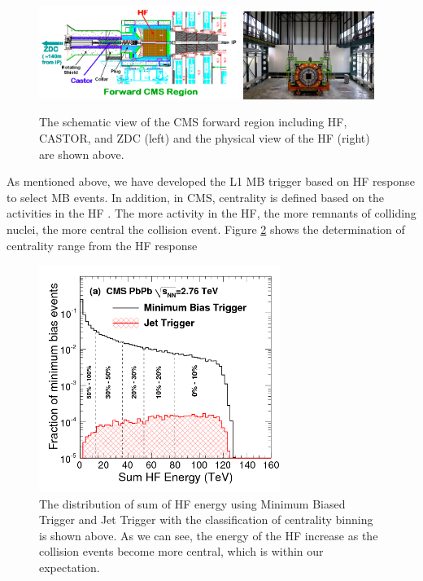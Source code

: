 \begin{figure}[hbtp]
\begin{center}
\includegraphics[width=0.58\textwidth]{Figures/Chapter3/CMSForwardRegion.png}
\includegraphics[width=0.38\textwidth]{Figures/Chapter3/HFReal.jpg}
\caption{The schematic view of the CMS forward region including HF, CASTOR, and ZDC (left) and the physical view of the HF (right) are shown above.}
\label{HFPic}
\end{center}
\end{figure} 

As mentioned above, we have developed the L1 MB trigger based on HF response to select MB events. In addition, in CMS, centrality is defined based on the activities in the HF \cite{HFCentRef}. The more activity in the HF, the more remnants of colliding nuclei, the more central the collision event. Figure \ref{HFCent} shows the determination of centrality range from the HF response 



\begin{figure}[hbtp]
\begin{center}
\includegraphics[width=0.70\textwidth]{Figures/Chapter3/HFCent.png}
\caption{The distribution of sum of HF energy using Minimum Biased Trigger and Jet Trigger with the classification of centrality binning is shown above. As we can see, the energy of the HF increase as the collision events become more central, which  is within our expectation.}
\label{HFCent}
\end{center}
\end{figure} 



